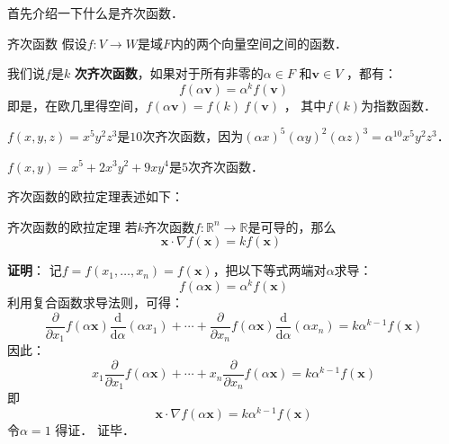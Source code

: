 

首先介绍一下什么是齐次函数．

\begin{definition}{齐次函数}
假设$f: V \to W $是域$ F $内的两个向量空间之间的函数．

我们说$f$是$k$ \textbf{次齐次函数}，如果对于所有非零的$\alpha \in F$ 和$\mathbf{v} \in V$ ，都有：
\begin{equation}
f(\alpha \mathbf{v}) = \alpha^k f(\mathbf{v}) 
\end{equation}
即是，在欧几里得空间，$f(\alpha \mathbf{v}) = f(k) \ f(\mathbf{v})$ ， 其中$f(k)$为指数函数．
\end{definition}

\begin{example}{}
$f(x,y,z)=x^5y^2z^3$是$10$次齐次函数，因为$(\alpha x)^5(\alpha y)^2(\alpha z)^3=\alpha^{10}x^5y^2z^3$．

$f(x,y)=x^5 + 2 x^3 y^2 + 9 x y^4$是$5$次齐次函数．
\end{example}

齐次函数的欧拉定理表述如下：

\begin{theorem}{齐次函数的欧拉定理}
若$k$齐次函数$ f:\mathbb{R}^n \to \mathbb{R}$是可导的，那么
\begin{equation}
{\displaystyle \mathbf {x} \cdot \nabla f(\mathbf {x} )=kf(\mathbf {x} )\qquad }
\end{equation}
\end{theorem}
\textbf{证明}： 记$f=f(x_{1},\ldots ,x_{n})=f(\mathbf {x} )$，把以下等式两端对$\alpha$求导：
\begin{equation}
{\displaystyle f(\alpha \mathbf {x} )=\alpha ^{k}f(\mathbf {x} )}
\end{equation}
利用复合函数求导法则，可得：
\begin{equation}
{\frac {\partial }{\partial x_{1}}}f(\alpha \mathbf {x} ){\frac {\mathrm {d} }{\mathrm {d} \alpha }}(\alpha x_{1})+\cdots +{\frac {\partial }{\partial x_{n}}}f(\alpha \mathbf {x} ){\frac {\mathrm {d} }{\mathrm {d} \alpha }}(\alpha x_{n})=k\alpha ^{k-1}f(\mathbf {x} )
\end{equation}
因此：
\begin{equation}
x_{1}{\frac {\partial }{\partial x_{1}}}f(\alpha \mathbf {x} )+\cdots +x_{n}{\frac {\partial }{\partial x_{n}}}f(\alpha \mathbf {x} )=k\alpha ^{k-1}f(\mathbf {x} )
\end{equation}
即
\begin{equation}
\mathbf {x} \cdot \nabla f(\alpha \mathbf {x} )=k\alpha ^{k-1}f(\mathbf {x} )
\end{equation}
令$\alpha=1$ 得证． 证毕．


